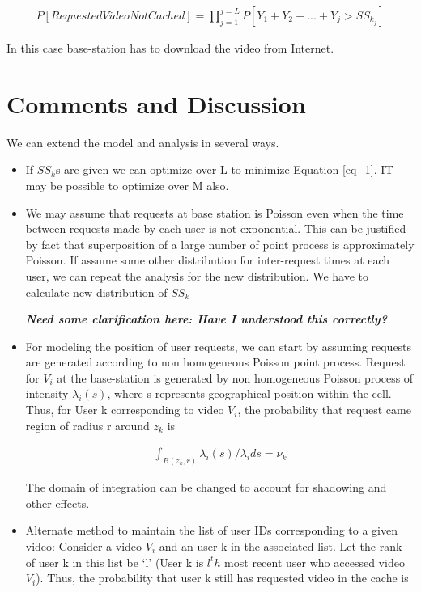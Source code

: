 \documentclass[12pt]{article}
\begin{document}
\begin{itemize}
\begin{align}
    P[Requested Video Not Cached] = \prod_{j = 1}^{j=L} P[Y_1 + Y_2 +...+ Y_{j} > SS_{k_j}]
    \label{eq_1}
\end{align}

In this case base-station has to download the video from Internet.

\end{itemize}

\section*{Comments and Discussion}
We can extend the model and analysis in several ways.

 
\begin{itemize}

\item If $SS_k$s are given we can optimize over L to minimize Equation \ref{eq_1}. IT may be possible to optimize over M also. 

\item We may assume that requests at base station is Poisson even when the time between requests made by each user is not exponential. This can be justified by fact that superposition of a large number of point process is approximately Poisson. If assume some other distribution for inter-request times at each user, we can repeat the analysis for the new distribution. We have to  calculate new distribution of $SS_k$

\textbf{\textit{Need some clarification here: Have I understood this correctly?}}

\item For modeling the position of user requests, we can start by assuming requests are generated according to non homogeneous Poisson point process. Request for $V_i$ at the base-station is generated by non homogeneous Poisson process of intensity $\lambda_i(s)$, where s represents geographical  position within the cell. Thus, for User k corresponding to video $V_i$, the probability that request came region of radius r around $z_k$ is 

\begin{align}
	\int_{B(z_k,r)} \lambda_{i}(s) / \lambda_i ds = \nu_k
\end{align}

The domain of integration can be changed to account for shadowing and other effects.

\item Alternate method to maintain the list of user IDs corresponding to a given video:
Consider a video $V_i$ and an user k in the associated list. Let the rank of user k in this list be `l' (User k is $l^th$ most recent user who accessed video $V_i$). Thus, the probability that user k still has requested video in the cache is 


\end{itemize}
\end{document}
